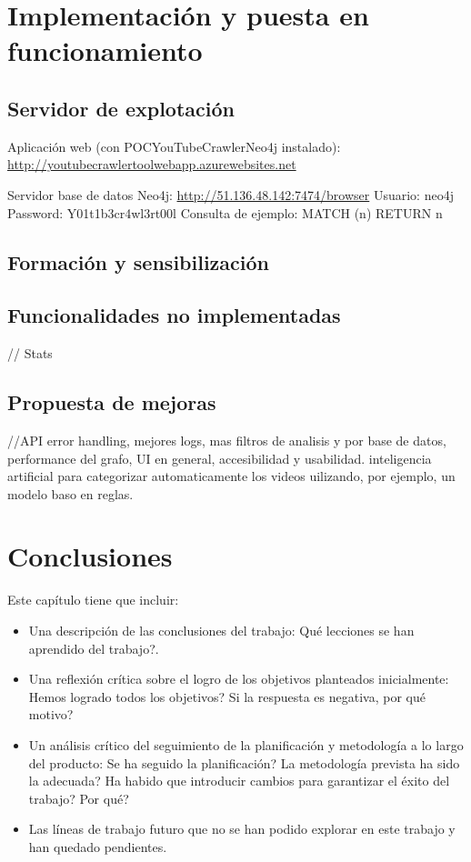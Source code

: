 \documentclass[11pt,a4paper]{article}
\begin{document}
\newpage 


\section{Implementación y puesta en funcionamiento}
\bigskip 

\subsection{Servidor de explotación}
Aplicación web (con POCYouTubeCrawlerNeo4j instalado):
\url{http://youtubecrawlertoolwebapp.azurewebsites.net} 

Servidor base de datos Neo4j:
\url{http://51.136.48.142:7474/browser} 
Usuario: neo4j
Password: Y01t1b3cr4wl3rt00l
Consulta de ejemplo: MATCH (n) RETURN n
\medskip 

\subsection{Formación y sensibilización}
\medskip 

\subsection{Funcionalidades no implementadas}
// Stats
\medskip 

\subsection{Propuesta de mejoras}
//API error handling, mejores logs, mas filtros de analisis y por base de datos, performance del grafo, UI en general, accesibilidad y usabilidad. inteligencia artificial para categorizar automaticamente los videos uilizando, por ejemplo, un modelo baso en reglas.
\newpage 




\section{Conclusiones}
\bigskip 

Este capítulo tiene que incluir:
\begin{itemize}
\item Una descripción de las conclusiones del trabajo: Qué lecciones se han aprendido del trabajo?.
\item Una reflexión crítica sobre el logro de los objetivos planteados inicialmente: Hemos logrado todos los objetivos? Si la respuesta es negativa, por qué motivo? 
\item Un análisis crítico del seguimiento de la planificación y metodología a lo largo del producto: Se ha seguido la planificación? La metodología prevista ha sido la adecuada? Ha habido que introducir cambios para garantizar el éxito del trabajo? Por qué? 
\item Las líneas de trabajo futuro que no se han podido explorar en este trabajo y han quedado pendientes.
\end{itemize}
\end{document}

